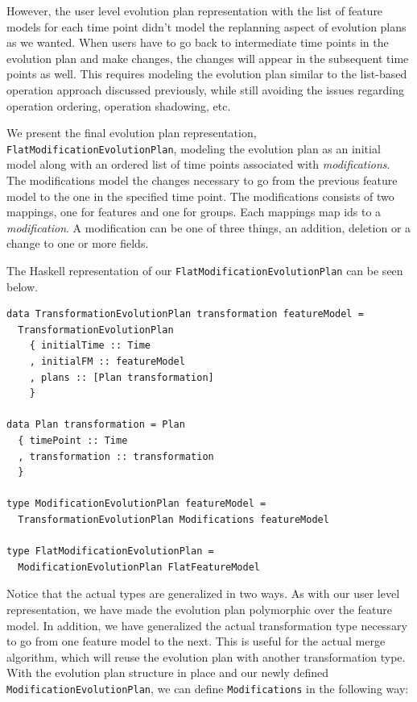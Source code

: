 \documentclass[a4paper,english]{ifimaster}
\begin{document}
However, the user level evolution plan representation with the list of feature models for each time point didn't model the replanning aspect of evolution plans as we wanted. When users have to go back to intermediate time points in the evolution plan and make changes, the changes will appear in the subsequent time points as well. This requires modeling the evolution plan similar to the list-based operation approach discussed previously, while still avoiding the issues regarding operation ordering, operation shadowing, etc.

We present the final evolution plan representation, \texttt{FlatModificationEvolutionPlan}, modeling the evolution plan as an initial model along with an ordered list of time points associated with \textit{modifications}. The modifications model the changes necessary to go from the previous feature model to the one in the specified time point. The modifications consists of two mappings, one for features and one for groups. Each mappings map ids to a \textit{modification}. A modification can be one of three things, an addition, deletion or a change to one or more fields.

The Haskell representation of our \texttt{FlatModificationEvolutionPlan} can be seen below.

\begin{verbatim}
data TransformationEvolutionPlan transformation featureModel = 
  TransformationEvolutionPlan
    { initialTime :: Time
    , initialFM :: featureModel
    , plans :: [Plan transformation]
    }

data Plan transformation = Plan
  { timePoint :: Time
  , transformation :: transformation
  }

type ModificationEvolutionPlan featureModel = 
  TransformationEvolutionPlan Modifications featureModel

type FlatModificationEvolutionPlan = 
  ModificationEvolutionPlan FlatFeatureModel
\end{verbatim}

Notice that the actual types are generalized in two ways. As with our user level representation, we have made the evolution plan polymorphic over the feature model. In addition, we have generalized the actual transformation type necessary to go from one feature model to the next. This is useful for the actual merge algorithm, which will reuse the evolution plan with another transformation type. With the evolution plan structure in place and our newly defined \texttt{ModificationEvolutionPlan}, we can define \texttt{Modifications} in the following way:
\end{document}
